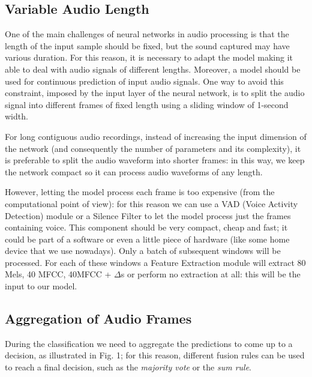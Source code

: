 \documentclass[conference]{IEEEtran}
\begin{document}
\subsection{Variable Audio Length}
One of the main challenges of neural networks in audio processing is that the length of the input sample should be fixed, but the sound captured may have various duration. For this reason, it is necessary to adapt the model making it able to deal with audio signals of different lengths. Moreover, a model should be used for continuous prediction of input audio signals. One way to avoid this constraint, imposed by the input layer of the neural network, is to split the audio signal into different frames of fixed length using a sliding window of 1-second width.

For long contiguous audio recordings, instead of increasing the input dimension of the network (and consequently the number of parameters and its complexity), it is preferable to split the audio waveform into shorter frames: in this way, we keep the network compact so it can process audio waveforms of any length.

However, letting the model process each frame is too expensive (from the computational point of view): for this reason we can use a VAD (Voice Activity Detection) module or a Silence Filter to let the model process just the frames containing voice. This component should be very compact, cheap and fast; it could be part of a software or even a little piece of hardware (like some home device that we use nowadays).
Only a batch of subsequent windows will be processed. For each of these windows a Feature Extraction module will extract 80 Mels, 40 MFCC, 40MFCC + $\Delta$s or perform no extraction at all: this will be the input to our model.

\subsection{Aggregation of Audio Frames}
During the classification we need to aggregate the predictions to come up to a decision, as illustrated in Fig. 1; for this reason, different fusion rules can be used to reach a final decision, such as the \textit{majority vote} or the \textit{sum rule}.
\end{document}

